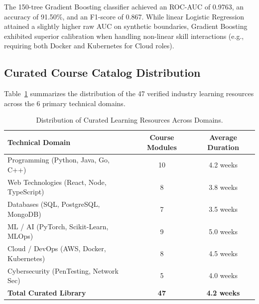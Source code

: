 \documentclass[conference]{IEEEtran}
\begin{document}
The 150-tree Gradient Boosting classifier achieved an ROC-AUC of 0.9763, an accuracy of 91.50\%, and an F1-score of 0.867. While linear Logistic Regression attained a slightly higher raw AUC on synthetic boundaries, Gradient Boosting exhibited superior calibration when handling non-linear skill interactions (e.g., requiring both Docker and Kubernetes for Cloud roles).

\subsection{Curated Course Catalog Distribution}
Table~\ref{tab:c4_courses} summarizes the distribution of the 47 verified industry learning resources across the 6 primary technical domains.

\begin{table}[htbp]
\caption{Distribution of Curated Learning Resources Across Domains.}
\begin{center}
\begin{tabular}{lcc}
\toprule
\textbf{Technical Domain} & \textbf{Course Modules} & \textbf{Average Duration} \\
\midrule
Programming (Python, Java, Go, C++) & 10 & 4.2 weeks \\
Web Technologies (React, Node, TypeScript) & 8 & 3.8 weeks \\
Databases (SQL, PostgreSQL, MongoDB) & 7 & 3.5 weeks \\
ML / AI (PyTorch, Scikit-Learn, MLOps) & 9 & 5.0 weeks \\
Cloud / DevOps (AWS, Docker, Kubernetes) & 8 & 4.5 weeks \\
Cybersecurity (PenTesting, Network Sec) & 5 & 4.0 weeks \\
\midrule
\textbf{Total Curated Library} & \textbf{47} & \textbf{4.2 weeks} \\
\bottomrule
\end{tabular}
\label{tab:c4_courses}
\end{center}
\end{table}
\end{document}
